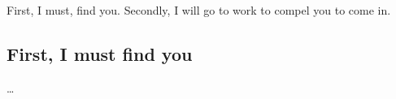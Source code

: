 \documentclass[
]{book}
\begin{document}
First, I must, find you. Secondly, I will go to work to compel you to come in.

\hypertarget{first-i-must-find-you}{%
\subsection*{First, I must find you}\label{first-i-must-find-you}}

\ldots{}
\end{document}
